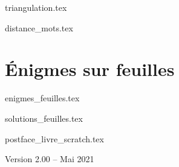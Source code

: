 \documentclass[11pt,twoside]{report}
\begin{document}
{triangulation.tex}

{distance_mots.tex}

\clearemptydoublepage
\setcounter{chapter}{0}

\part{Énigmes sur feuilles}

{enigmes_feuilles.tex}

{solutions_feuilles.tex}



{postface_livre_scratch.tex}

\vfill
\bigskip
\bigskip

\centerline{Version 2.00 -- Mai 2021}
\end{document}
